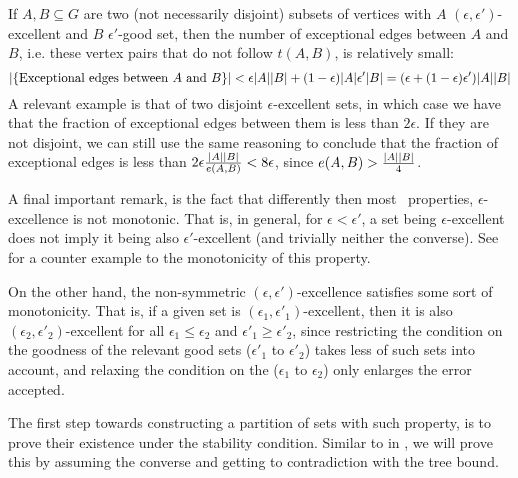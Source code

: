     \begin{remark} \label{rmk:excellence_imply_little_exceptions}
        If $A, B \subseteq G$ are two (not necessarily disjoint) subsets of vertices
        with $A$ $(\epsilon, \epsilon')$-excellent and $B$ $\epsilon'$-good set, then the number of exceptional edges between $A$ and $B$,
        i.e. these vertex pairs that do not follow $t(A,B)$, is relatively small:
        \[
            | \{ \text{Exceptional edges between } A \text{ and } B \} | <
                \epsilon |A| |B| + (1- \epsilon) |A| \epsilon' |B| = ( \epsilon + ( 1-\epsilon ) \epsilon' ) |A| |B|
        \]
        A relevant example is that of two disjoint $\epsilon$-excellent sets, in which case we have that the fraction
        of exceptional edges between them is less than $2\epsilon$.
        If they are not disjoint, we can still use the same reasoning to conclude that the fraction of exceptional edges
        is less than $2 \epsilon \frac{| A | | B |}{e(A,B)} < 8 \epsilon$, since
        $e(A,B) > \frac{| A | | B |}{4}$.
    \end{remark}

    \begin{remark}
        A final important remark, is the fact that differently then most \regular~properties, $\epsilon$-excellence is
        not monotonic. 
        That is, in general, for $\epsilon < \epsilon'$, a set being $\epsilon$-excellent does not imply
        it being also $\epsilon'$-excellent (and trivially neither the converse).
        See  for a counter example to the monotonicity of this property.

        On the other hand, the non-symmetric $(\epsilon, \epsilon')$-excellence satisfies some sort of monotonicity.
        That is, if a given set is $(\epsilon_1, \epsilon'_1)$-excellent, then it is also
        $(\epsilon_2, \epsilon'_2)$-excellent for all $\epsilon_1 \leq \epsilon_2$ and $\epsilon'_1 \geq \epsilon'_2$,
        since restricting the condition on the goodness of the relevant good sets ($\epsilon'_1$ to $\epsilon'_2$)
        takes less of such sets into account, and relaxing the condition on the 
        ($\epsilon_1$ to $\epsilon_2$) only enlarges the error accepted.
    \end{remark}

    The first step towards constructing a partition of sets with such property, is to prove their existence under the
    stability condition.
    Similar to  in , we will prove this by assuming
    the converse and getting to contradiction with the tree bound.

